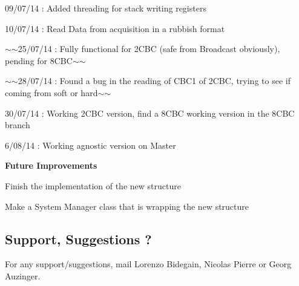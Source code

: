 \begin{DoxyItemize}
\item 09/07/14 \-: Added threading for stack writing registers
\item 10/07/14 \-: Read Data from acquisition in a rubbish format
\item $\sim$$\sim$25/07/14 \-: Fully functional for 2\-C\-B\-C (safe from Broadcast obviously), pending for 8\-C\-B\-C$\sim$$\sim$
\item $\sim$$\sim$28/07/14 \-: Found a bug in the reading of C\-B\-C1 of 2\-C\-B\-C, trying to see if coming from soft or hard$\sim$$\sim$
\item 30/07/14 \-: Working 2\-C\-B\-C version, find a 8\-C\-B\-C working version in the 8\-C\-B\-C branch
\item 6/08/14 \-: Working agnostic version on Master \par
 \par
 {\bfseries Future Improvements}
\item Finish the implementation of the new structure
\item Make a System Manager class that is wrapping the new structure
\end{DoxyItemize}

\subsection*{Support, Suggestions ? }

For any support/suggestions, mail Lorenzo Bidegain, Nicolas Pierre or Georg Auzinger. 